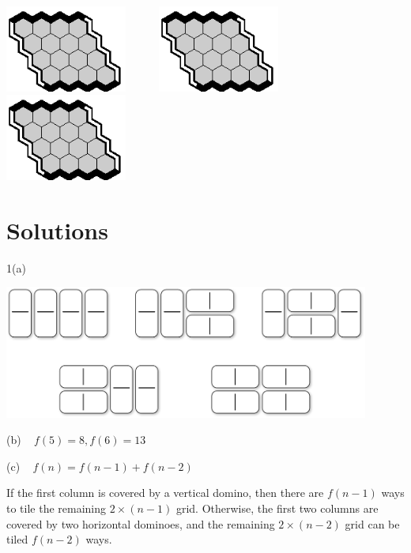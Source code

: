 \documentclass[12pt]{article}
\begin{document}
\begin{center}
\includegraphics[width=40mm]{fz/pix/4x4.eps}~~~~~~\includegraphics[width=40mm]{fz/pix/4x4.eps}~~~~~~\includegraphics[width=40mm]{fz/pix/4x4.eps}
\end{center}
\newpage
\section*{Solutions}

\begin{minipage}[c]{1cm}
1(a)  ~
\end{minipage}
\begin{minipage}[c]{120mm}
\includegraphics[width=120mm]{Figures/24-tilings.eps}
\end{minipage}
\vfill

(b) ~ $f(5) = 8, f(6) = 13$
\vfill

(c) ~ $f(n) = f(n-1) + f(n-2)$
\vfill

\noindent 
If the first column is covered by a vertical domino,
then there are $f(n-1)$ ways to tile the remaining $2 \times (n-1)$ grid.
Otherwise, the first two columns are covered by two horizontal dominoes,
and the remaining $2 \times (n-2)$ grid can be tiled $f(n-2)$ ways.
\vfill
\end{document}
